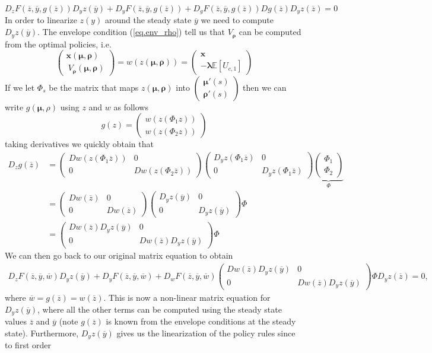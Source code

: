 \documentclass[thmsb,11pt]{article}
\newcommand{\bmat}{\begin{matrix}}
\newcommand{\emat}{\end{matrix}}
\newcommand{\ov}{\overline}
\begin{document}
\[
	D_zF(\ov z,\ov y, g(\ov z))D_yz(\ov y)+D_yF(\ov z, \ov y, g(\ov z)) + D_g F(\ov z, \ov y, g(\ov z)) D g(\ov z) D_y z(\ov z) = 0
\]  In order to linearize $z(y)$ around the steady state $\ov y$ we need to compute $D_y z(\ov y)$.   The envelope condition (\ref{eq.env_rho}) tell us that $V_{\bm \rho}$ can be computed from the optimal policies, i.e.
\[
	\left(\bmat \bm x(\bm \mu,\bm \rho)\\\ V_{\bm \rho}(\bm \mu,\bm \rho)\emat\right) = w( z(\bm \mu,\bm \rho) ) =  \left(\bmat \bm x\\ -\bm \lambda \mathbb E\left[U_{c,1}\right]\emat\right)
\]  If we let $\Phi_s$ be the matrix that maps $z(\bm \mu,\bm \rho)$ into $\left(\bmat \bm \mu'(s)\\ \bm \rho'(s)\emat\right)$ then we can write $g(\bm \mu,\rho)$ using $z$ and $w$ as follows
\[
	g(z) = \left(\bmat w(z(\Phi_1 z))\\ w(z(\Phi_2 z))\emat\right)
\]taking derivatives we quickly obtain that
\begin{align*}
	D_z g(\ov z) &= \left(\bmat D w(z(\Phi_1 \ov z)) & 0 \\ 0&  D w(z(\Phi_2 \ov z))\emat\right)\left(\bmat D_y z(\Phi_1 \ov z) & 0\\ 0& D_y z(\Phi_1\ov z)\emat\right) \underbrace{\left(\bmat \Phi_1\\ \Phi_2\emat\right)}_{\Phi}\\
	&=\left(\bmat Dw(\ov z) &0\\0& D w(\ov z)\emat\right)\left(\bmat D_y z(\ov y) &0\\0&D_y z(\ov y)\emat\right)\Phi\\
	&=\left(\bmat Dw(\ov z)D_y z(\ov y) &0\\0& D w(\ov z)D_y z(\ov y)\emat\right)\Phi
\end{align*}  We can then go back to our original matrix equation to obtain
\begin{align}
	D_zF(\ov z,\ov y, \ov w)D_yz(\ov y)+D_yF(\ov z, \ov y, \ov w) + D_w F(\ov z, \ov y, \ov w)\left(\bmat Dw(\ov z)D_y z(\ov y) &0\\0& D w(\ov z)D_y z(\ov y)\emat\right)\Phi D_y z(\ov z) = 0\label{eq.linearization},
\end{align} where $\ov w = g(\ov z) = w(\ov z)$.  This is now a non-linear matrix equation for $D_y z(\ov y)$,  where all the other terms can be computed using the steady state values $\ov z$ and $\ov y$ (note $g(\ov z)$ is known from the envelope conditions at the steady state).  Furthermore, $D_y z(\ov y)$ gives us the linearization of the policy rules since to first order
\end{document}

